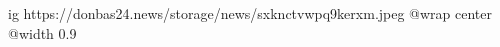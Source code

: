  
 
 
 
 

\ifcmt
  ig https://donbas24.news/storage/news/sxknctvwpq9kerxm.jpeg
  @wrap center
  @width 0.9
\fi
